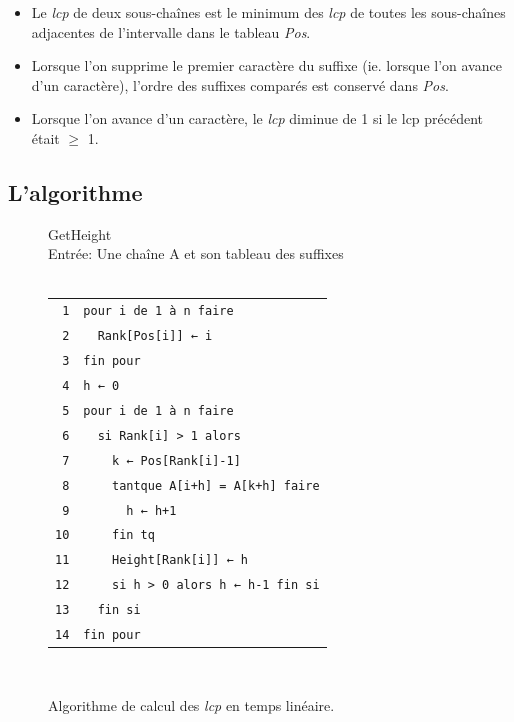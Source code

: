 \documentclass[a4paper,10pt]{article}
\begin{document}
\begin{itemize}
\item Le \textit{lcp} de deux sous-chaînes est le minimum des \textit{lcp} de
toutes les sous-chaînes adjacentes de l'intervalle dans le tableau
\textit{Pos}. %


\item Lorsque l'on supprime le premier caractère du suffixe (ie. lorsque l'on
avance d'un caractère), l'ordre des suffixes comparés est conservé dans
\textit{Pos}.


\item Lorsque l'on avance d'un caractère, le \textit{lcp} diminue de 1 si le lcp
précédent était $\geq$ 1.
\end{itemize}

\subsection{L'algorithme}
\label{sec:algo}

\begin{figure}[h]
  GetHeight\\
  Entrée: Une chaîne A et son tableau des suffixes\\ \hfill \\
  \begin{tabular}{r|l}
    \texttt{1}  & \verb!pour i de 1 à n faire!\\
    \texttt{2}  & \verb!  Rank[Pos[i]] ← i!\\
    \texttt{3}  & \verb!fin pour!\\
    \texttt{4}  & \verb!h ← 0!\\
    \texttt{5}  & \verb!pour i de 1 à n faire!\\
    \texttt{6}  & \verb!  si Rank[i] > 1 alors!\\
    \texttt{7}  & \verb!    k ← Pos[Rank[i]-1]!\\
    \texttt{8}  & \verb!    tantque A[i+h] = A[k+h] faire!\\
    \texttt{9}  & \verb!      h ← h+1!\\
    \texttt{10} & \verb!    fin tq!\\
    \texttt{11} & \verb!    Height[Rank[i]] ← h!\\
    \texttt{12} & \verb!    si h > 0 alors h ← h-1 fin si!\\
    \texttt{13} & \verb!  fin si!\\
    \texttt{14} & \verb!fin pour!\\
  \end{tabular}\\
  \caption{Algorithme de calcul des \textit{lcp} en temps linéaire.}
  \label{fig:getheight}
\end{figure}
\end{document}
